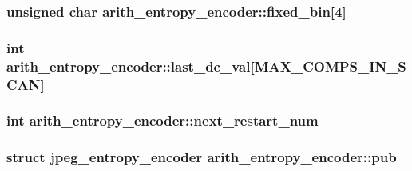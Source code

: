 \subsubsection[{fixed\+\_\+bin}]{\setlength{\rightskip}{0pt plus 5cm}unsigned char arith\+\_\+entropy\+\_\+encoder\+::fixed\+\_\+bin\mbox{[}4\mbox{]}}\label{structarith__entropy__encoder_a06cb7a9a6db5a785f6630e5b5606ae5d}
\hypertarget{structarith__entropy__encoder_a60ba4c07f691b539ba51a25a20dc38ae}{}
\subsubsection[{last\+\_\+dc\+\_\+val}]{\setlength{\rightskip}{0pt plus 5cm}int arith\+\_\+entropy\+\_\+encoder\+::last\+\_\+dc\+\_\+val\mbox{[}{\bf M\+A\+X\+\_\+\+C\+O\+M\+P\+S\+\_\+\+I\+N\+\_\+\+S\+C\+A\+N}\mbox{]}}\label{structarith__entropy__encoder_a60ba4c07f691b539ba51a25a20dc38ae}
\hypertarget{structarith__entropy__encoder_ad523833a7d6fa8c645fb9d18de18b487}{}
\subsubsection[{next\+\_\+restart\+\_\+num}]{\setlength{\rightskip}{0pt plus 5cm}int arith\+\_\+entropy\+\_\+encoder\+::next\+\_\+restart\+\_\+num}\label{structarith__entropy__encoder_ad523833a7d6fa8c645fb9d18de18b487}
\hypertarget{structarith__entropy__encoder_adaa616ab2a0f584358f8233775146d68}{}
\subsubsection[{pub}]{\setlength{\rightskip}{0pt plus 5cm}struct {\bf jpeg\+\_\+entropy\+\_\+encoder} arith\+\_\+entropy\+\_\+encoder\+::pub}\label{structarith__entropy__encoder_adaa616ab2a0f584358f8233775146d68}
\hypertarget{structarith__entropy__encoder_add27b20b9b70a05f49c4242844253109}{}
